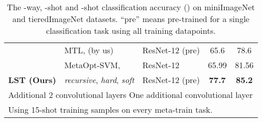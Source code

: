 \documentclass{article}
\begin{document}
\begin{table*}
\begin{tabular}{l l lcc}
    & MTL, \cite{SunCVPR2019} (by us) & ResNet-12 (pre) & 65.6    & 78.6   \\
    & MetaOpt-SVM, \cite{LeeCVPR19svm} & ResNet-12 & 65.99    & 81.56   \\
\midrule
\textbf{LST (Ours)} & \emph{recursive}, \emph{hard}, \emph{soft}  & ResNet-12 (pre) & \textbf{77.7}   & \textbf{85.2}   \\
\bottomrule
    \multicolumn{5}{l}{Additional 2 convolutional layers { } One additional convolutional layer} \\
    \multicolumn{5}{l}{Using 15-shot training samples on every meta-train task.} \\
\end{tabular}
\vspace{-0.1cm}
  \caption{The -way, -shot and -shot classification accuracy () on miniImageNet and tieredImageNet datasets. ``pre'' means pre-trained for a single classification task using all training datapoints.}
    \label{table_mini}
    \vspace{-0.1cm}
\end{table*}
\end{document}
